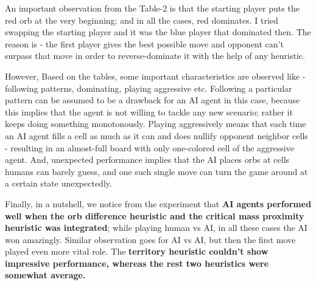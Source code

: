 \documentclass[a4paper, 13pt]{article}
\begin{document}
	An important observation from the Table-2 is that the starting player puts the red orb at the very beginning; and in all the cases, red dominates. I tried swapping the starting player and it was the blue player that dominated then. The reason is - the first player gives the best possible move and opponent can't surpass that move in order to reverse-dominate it with the help of any heuristic.
	
	However, Based on the tables, some important characteristics are observed like - following patterns, dominating, playing aggressive etc. Following a particular pattern can be assumed to be a drawback for an AI agent in this case, because this implies that the agent is not willing to tackle any new scenario; rather it keeps doing something monotonously. Playing aggressively means that each time an AI agent fills a cell as much as it can and does nullify opponent neighbor cells - resulting in an almost-full board with only one-colored cell of the aggressive agent. And, unexpected performance implies that the AI places orbs at cells humans can barely guess, and one such single move can turn the game around at a certain state unexpectedly.
	
	Finally, in a nutshell, we notice from the experiment that \textbf{AI agents performed well when the orb difference heuristic and the critical mass proximity heuristic was integrated}; while playing human vs AI, in all these cases the AI won amazingly. Similar observation goes for AI vs AI, but then the first move played even more vital role. The \textbf{territory  heuristic couldn't show impressive performance, whereas the rest two heuristics were somewhat average.}
\end{document}
